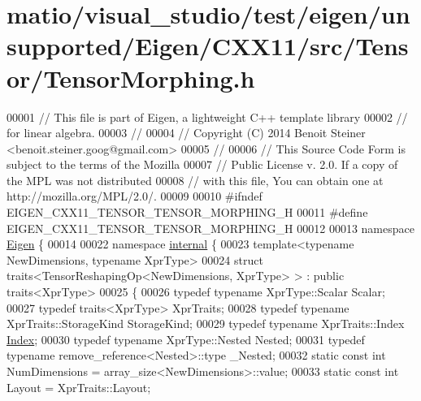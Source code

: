 \hypertarget{matio_2visual__studio_2test_2eigen_2unsupported_2_eigen_2_c_x_x11_2src_2_tensor_2_tensor_morphing_8h_source}{}\section{matio/visual\+\_\+studio/test/eigen/unsupported/\+Eigen/\+C\+X\+X11/src/\+Tensor/\+Tensor\+Morphing.h}
\label{matio_2visual__studio_2test_2eigen_2unsupported_2_eigen_2_c_x_x11_2src_2_tensor_2_tensor_morphing_8h_source}

\begin{DoxyCode}
00001 \textcolor{comment}{// This file is part of Eigen, a lightweight C++ template library}
00002 \textcolor{comment}{// for linear algebra.}
00003 \textcolor{comment}{//}
00004 \textcolor{comment}{// Copyright (C) 2014 Benoit Steiner <benoit.steiner.goog@gmail.com>}
00005 \textcolor{comment}{//}
00006 \textcolor{comment}{// This Source Code Form is subject to the terms of the Mozilla}
00007 \textcolor{comment}{// Public License v. 2.0. If a copy of the MPL was not distributed}
00008 \textcolor{comment}{// with this file, You can obtain one at http://mozilla.org/MPL/2.0/.}
00009 
00010 \textcolor{preprocessor}{#ifndef EIGEN\_CXX11\_TENSOR\_TENSOR\_MORPHING\_H}
00011 \textcolor{preprocessor}{#define EIGEN\_CXX11\_TENSOR\_TENSOR\_MORPHING\_H}
00012 
00013 \textcolor{keyword}{namespace }\hyperlink{namespace_eigen}{Eigen} \{
00014 
00022 \textcolor{keyword}{namespace }\hyperlink{namespaceinternal}{internal} \{
00023 \textcolor{keyword}{template}<\textcolor{keyword}{typename} NewDimensions, \textcolor{keyword}{typename} XprType>
00024 \textcolor{keyword}{struct }traits<TensorReshapingOp<NewDimensions, XprType> > : \textcolor{keyword}{public} traits<XprType>
00025 \{
00026   \textcolor{keyword}{typedef} \textcolor{keyword}{typename} XprType::Scalar Scalar;
00027   \textcolor{keyword}{typedef} traits<XprType> XprTraits;
00028   \textcolor{keyword}{typedef} \textcolor{keyword}{typename} XprTraits::StorageKind StorageKind;
00029   \textcolor{keyword}{typedef} \textcolor{keyword}{typename} XprTraits::Index \hyperlink{namespace_eigen_a62e77e0933482dafde8fe197d9a2cfde}{Index};
00030   \textcolor{keyword}{typedef} \textcolor{keyword}{typename} XprType::Nested Nested;
00031   \textcolor{keyword}{typedef} \textcolor{keyword}{typename} remove\_reference<Nested>::type \_Nested;
00032   \textcolor{keyword}{static} \textcolor{keyword}{const} \textcolor{keywordtype}{int} NumDimensions = array\_size<NewDimensions>::value;
00033   \textcolor{keyword}{static} \textcolor{keyword}{const} \textcolor{keywordtype}{int} Layout = XprTraits::Layout;

\end{DoxyCode}
